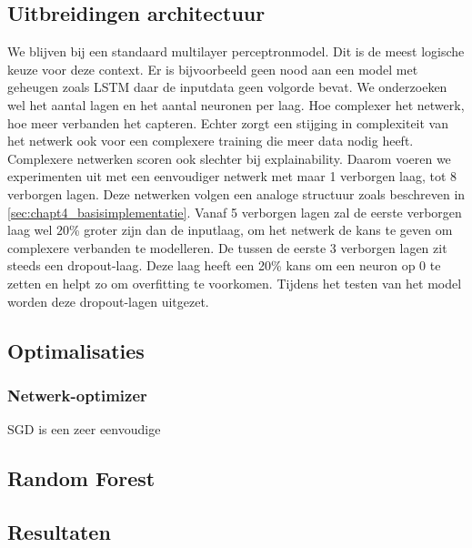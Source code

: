 \subsection{Uitbreidingen architectuur}
We blijven bij een standaard multilayer perceptronmodel. Dit is de meest logische keuze voor deze context. Er is bijvoorbeeld geen nood aan een model met geheugen zoals LSTM daar de inputdata geen volgorde bevat. 
We onderzoeken wel het aantal lagen en het aantal neuronen per laag. Hoe complexer het netwerk, hoe meer verbanden het capteren. Echter zorgt een stijging in complexiteit van het netwerk ook voor een complexere training die meer data nodig heeft. Complexere netwerken scoren ook slechter bij explainability. Daarom voeren we experimenten uit met een eenvoudiger netwerk met maar 1 verborgen laag, tot 8 verborgen lagen. Deze netwerken volgen een analoge structuur zoals beschreven in \autoref{sec:chapt4_basisimplementatie}. Vanaf 5 verborgen lagen zal de eerste verborgen laag wel $20$\% groter zijn dan de inputlaag, om het netwerk de kans te geven om complexere verbanden te modelleren. De tussen de eerste 3 verborgen lagen zit steeds een dropout-laag. Deze laag heeft een 20\% kans om een neuron op 0 te zetten en helpt zo om overfitting te voorkomen. \cite{nn_dropout} Tijdens het testen van het model worden deze dropout-lagen uitgezet.

\subsection{Optimalisaties}
\subsubsection{Netwerk-optimizer}
SGD is een zeer eenvoudige 




\subsection{Random Forest}

\subsection{Resultaten}
